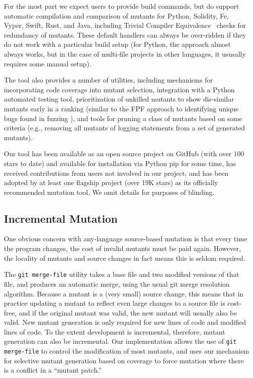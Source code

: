 \documentclass[sigconf,review, anonymous]{acmart}
\begin{document}
{For the most part we expect users to provide build commands, but do
support automatic compilation and comparison of mutants for Python,
Solidity, Fe, Vyper, Swift, Rust, and Java, including Trivial Compiler
Equivalence~\cite{TCE} checks for redundancy of mutants.  These
default handlers can always be over-ridden if they do not work with a
particular build setup (for Python, the approach almost always works,
but in the case of multi-file projects in other languages, it ususally
requires some manual setup).

The tool also provides a number of utilities, including mechanisms for
incorporating code coverage into mutant selection, integration with a
Python automated testing tool, prioritization of unkilled mutants to
show dis-similar mutants early in a ranking (similar to the FPF
approach to identifying unique bugs found in fuzzing
\cite{10.1145/2491956.2462173}), and tools for pruning a class of
mutants based on some criteria (e.g., removing all mutants of logging
statements from a set of generated mutants).

Our tool has been available as an open source project on GitHub (with
over 100 stars to date) and
available for installation via Python pip for
some time, has received contributions from users not involved in
our project, and has been adopted by at least one flagship project
(over 19K stars) as
its officially recommended mutation tool.  We omit details for
purposes of blinding.

\subsection{Incremental Mutation}

One obvious concern with any-language source-based mutation is that every time the
program changes, the cost of invalid mutants must be paid again.
However, the locality of mutants and source changes in fact means this
is seldom required.

The {\tt git merge-file} utility takes a base file and two modified
versions of that file, and produces an automatic merge, using the
usual git merge resolution algorithm.    Because a mutant is a (very
small) source change, this means that in practice updating a mutant to
reflect even large changes to a source file is cost-free, and if the
original mutant was valid, the new mutant will usually also be valid.
New mutant generation is only required for new lines of code and
modified lines of code.  To the extent development is incremental,
therefore, mutant generation can also be incremental.  Our
implementation allows the use of {\tt git merge-file} to control the
modification of most mutants, and uses our mechanism for
selective mutant generation based on coverage to force mutation where
there is a conflict in a ``mutant patch.''

}
\end{document}
